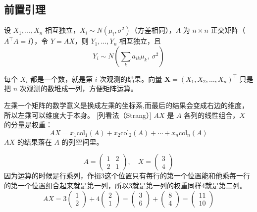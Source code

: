 \subsection{前置引理}
\begin{lemma}[正交变换引理]
设 $X_1, \ldots, X_n$ 相互独立，$X_i \sim N(\mu_i, \sigma^2)$（方差相同），$A$ 为 $n \times n$ 正交矩阵（$A^\top A = I$），令 $Y = AX$，则 $Y_1, \ldots, Y_n$ 相互独立，且
$$Y_i \sim N\!\left(\sum_k a_{ik}\mu_k,\ \sigma^2\right)$$
\end{lemma}
\begin{dxtips}
每个 $X_i$ 都是一个数，就是第 $i$ 次观测的结果。向量 $\boldsymbol{X} = (X_1, X_2, \ldots, X_n)^\top$ 只是把 $n$ 次观测的数堆成一列，方便矩阵运算。
\end{dxtips}
\begin{dxtips}
    左乘一个矩阵的数学意义是换成左乘的坐标系,而最后的结果会变成右边的维度，所以左乘可以维度大于本身。
    [列看法（Strang）]
$AX$ 是 $A$ 各列的线性组合，$X$ 的分量是权重：
$$AX = x_1\mathrm{col}_1(A) + x_2\mathrm{col}_2(A) + \cdots + x_n\mathrm{col}_n(A)$$
$AX$ 的结果落在 $A$ 的列空间里。

\end{dxtips}
\begin{example}[列看法具体计算]
$$A = \begin{pmatrix}1&2\\2&1\end{pmatrix}, \quad X = \begin{pmatrix}3\\4\end{pmatrix}$$
因为运算的时候是行乘列，作揖3这个位置只有每行的第一个位置能和他乘每一行的第一个位置组合起来就是第一列，所以3就是第一列的权重同样4就是第二列。
$$AX = 3\begin{pmatrix}1\\2\end{pmatrix} + 4\begin{pmatrix}2\\1\end{pmatrix} = \begin{pmatrix}3\\6\end{pmatrix} + \begin{pmatrix}8\\4\end{pmatrix} = \begin{pmatrix}11\\10\end{pmatrix}$$
\end{example}
